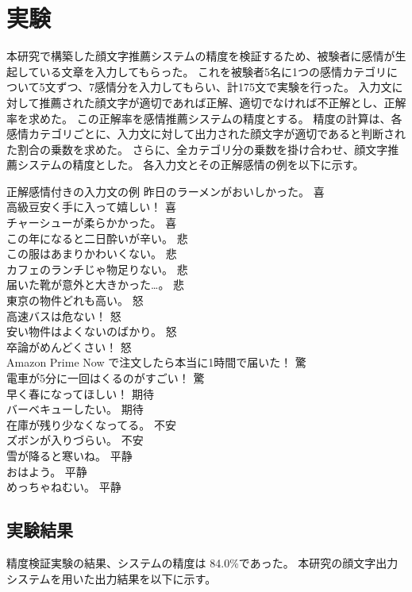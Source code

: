 \documentclass[11pt,a4j]{jsarticle}
\begin{document}
\section{実験}\label{sec:experiment}
本研究で構築した顔文字推薦システムの精度を検証するため、被験者に感情が生起している文章を入力してもらった。
これを被験者5名に1つの感情カテゴリについて5文ずつ、7感情分を入力してもらい、計175文で実験を行った。
入力文に対して推薦された顔文字が適切であれば正解、適切でなければ不正解とし、正解率を求めた。
この正解率を感情推薦システムの精度とする。
精度の計算は、各感情カテゴリごとに、入力文に対して出力された顔文字が適切であると判断された割合の乗数を求めた。
さらに、全カテゴリ分の乗数を掛け合わせ、顔文字推薦システムの精度とした。
各入力文とその正解感情の例を以下に示す。

\begin{itembox}[l]{正解感情付きの入力文の例}
昨日のラーメンがおいしかった。 喜 \\
高級豆安く手に入って嬉しい！ 喜\\
チャーシューが柔らかかった。 喜\\
この年になると二日酔いが辛い。 悲\\
この服はあまりかわいくない。 悲\\
カフェのランチじゃ物足りない。 悲\\
届いた靴が意外と大きかった…。 悲\\
東京の物件どれも高い。 怒\\
高速バスは危ない！ 怒\\
安い物件はよくないのばかり。 怒\\
卒論がめんどくさい！ 怒\\
Amazon Prime Now で注文したら本当に1時間で届いた！ 驚\\
電車が5分に一回はくるのがすごい！ 驚\\
早く春になってほしい！ 期待\\
バーベキューしたい。 期待\\
在庫が残り少なくなってる。 不安\\
ズボンが入りづらい。 不安\\
雪が降ると寒いね。 平静\\
おはよう。 平静\\
めっちゃねむい。 平静\\
\end{itembox}

  \subsection{実験結果}
精度検証実験の結果、システムの精度は 84.0\%であった。
本研究の顔文字出力システムを用いた出力結果を以下に示す。
\end{document}
